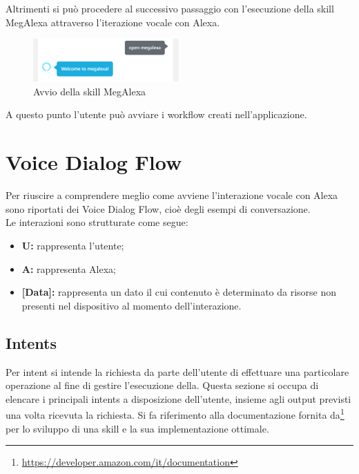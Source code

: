 \begin{itemize}
Altrimenti si può procedere al successivo passaggio con l'esecuzione della skill MegAlexa attraverso l'iterazione vocale con Alexa. \\

\begin{figure}[!ht]
	\centering
	\includegraphics[width=0.5\textwidth]{images/OpenMegAlexa.png}
	\caption{Avvio della skill MegAlexa}
\end{figure}

\end{itemize}

A questo punto l'utente può avviare i workflow creati nell'applicazione.\\

\newpage
\section{Voice Dialog Flow}
\label{VDF}
Per riuscire a comprendere meglio come avviene l'interazione vocale con Alexa sono riportati dei Voice Dialog Flow, cioè degli esempi di conversazione.\\

Le interazioni sono strutturate come segue:
\begin{itemize}
	\item \textbf{U:} rappresenta l'utente;
	\item \textbf{A:} rappresenta Alexa;
	\item \textbf{[Data]:} rappresenta un dato il cui contenuto è determinato da risorse non presenti nel dispositivo al momento dell'interazione.
\end{itemize}

\subsection{Intents}
Per intent si intende la richiesta da parte dell'utente di effettuare una particolare operazione al fine di gestire l'esecuzione della. 
Questa sezione si occupa di elencare i principali intents a disposizione dell'utente, insieme agli output previsti una volta ricevuta la richiesta.
Si fa riferimento alla documentazione fornita da\footnote{\url{https://developer.amazon.com/it/documentation}} per lo sviluppo di una skill e la sua implementazione ottimale.

